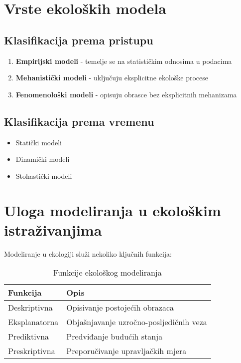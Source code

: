 \documentclass[12pt,a4paper,twoside]{book}
\begin{document}
	\section{Vrste ekoloških modela}
	
	\subsection{Klasifikacija prema pristupu}
	\begin{enumerate}
		\item \textbf{Empirijski modeli} - temelje se na statističkim odnosima u podacima
		\item \textbf{Mehanistički modeli} - uključuju eksplicitne ekološke procese
		\item \textbf{Fenomenološki modeli} - opisuju obrasce bez eksplicitnih mehanizama
	\end{enumerate}
	
	\subsection{Klasifikacija prema vremenu}
	\begin{itemize}
		\item Statički modeli
		\item Dinamički modeli
		\item Stohastički modeli
	\end{itemize}
	
	\section{Uloga modeliranja u ekološkim istraživanjima}
	
	Modeliranje u ekologiji služi nekoliko ključnih funkcija:
	
	\begin{table}[H]
		\centering
		\caption{Funkcije ekološkog modeliranja}
		\begin{tabular}{@{}ll@{}}
			\toprule
			Funkcija & Opis \\
			\midrule
			Deskriptivna & Opisivanje postojećih obrazaca \\
			Eksplanatorna & Objašnjavanje uzročno-posljedičnih veza \\
			Prediktivna & Predviđanje budućih stanja \\
			Preskriptivna & Preporučivanje upravljačkih mjera \\
			\bottomrule
		\end{tabular}
	\end{table}
	
\end{document}
